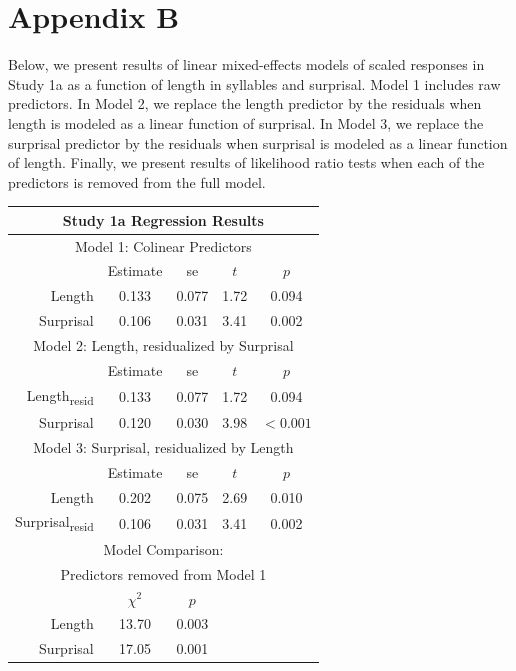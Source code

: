 \section{Appendix B}

Below, we present results of linear mixed-effects models of scaled responses in Study 1a as a function of length in syllables and surprisal.
Model 1 includes raw predictors.
In Model 2, we replace the length predictor by the residuals when length is modeled as a linear function of surprisal.
In Model 3, we replace the surprisal predictor by the residuals when surprisal is modeled as a linear function of length.
Finally, we present results of likelihood ratio tests when each of the predictors is removed from the full model.

\vspace{4mm}

\noindent
\footnotesize{
\begin{tabular}{r|cccc}
\hline
\hline
\multicolumn{5}{c}{\textbf{Study 1a Regression Results}} \\
\hline
\hline
\multicolumn{5}{c}{Model 1: Colinear Predictors} \\
& Estimate & se & $t$ & $p$ \\
\hline
Length & 0.133 & 0.077 & 1.72 & 0.094 \\
Surprisal & 0.106 & 0.031 & 3.41 & 0.002 \\
\hline
\hline
\multicolumn{5}{c}{Model 2: Length, residualized by Surprisal} \\
& Estimate & se & $t$ & $p$ \\
\hline
Length\textsubscript{resid} & 0.133 & 0.077 & 1.72 & 0.094 \\
Surprisal & 0.120 & 0.030 & 3.98 & $<0.001$ \\
\hline
\hline
\multicolumn{5}{c}{Model 3: Surprisal, residualized by Length} \\
& Estimate & se & $t$ & $p$ \\
\hline
Length & 0.202 & 0.075 & 2.69 & 0.010 \\
Surprisal\textsubscript{resid} & 0.106 & 0.031 & 3.41 & 0.002 \\
\hline
\hline
\multicolumn{5}{c}{Model Comparison:} \\
\multicolumn{5}{c}{Predictors removed from Model 1} \\
& $\chi^2$ & $p$ \\
\hline
Length & 13.70 & 0.003 \\
Surprisal & 17.05 & 0.001 \\
\hline
\hline
\end{tabular}
}



